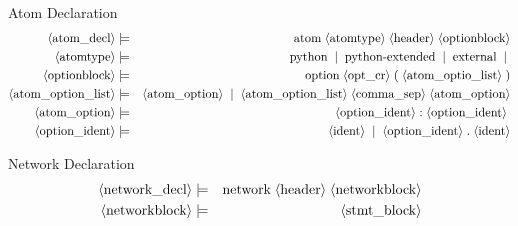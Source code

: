 Atom Declaration
\begin{eqnarray*}
  \pn{atom{\textunderscore}decl} &\pp&
    \sm{atom} \ww
    \pn{atomtype} \ww
    \pn{header} \ww
    \pn{optionblock} \\
  \pn{atomtype} &\pp&
    \sm{python} \oo
    \sm{python-extended} \oo
    \sm{external} \oo \\
  \pn{optionblock} &\pp&
    \sm{option} \ww
    \pn{opt{\textunderscore}cr} \ww
    \sm{(} \ww
    \pn{atom{\textunderscore}optio{\textunderscore}list} \ww
    \sm{)} \\
  \pn{atom{\textunderscore}option{\textunderscore}list} &\pp&
    \pn{atom{\textunderscore}option} \oo
    \pn{atom{\textunderscore}option{\textunderscore}list} \ww
    \pn{comma{\textunderscore}sep} \ww
    \pn{atom{\textunderscore}option} \\
  \pn{atom{\textunderscore}option} &\pp&
    \pn{option{\textunderscore}ident} \ww
    \sm{:} \ww
    \pn{option{\textunderscore}ident} \ww\\
  \pn{option{\textunderscore}ident} &\pp&
    \pn{ident} \oo
    \pn{option{\textunderscore}ident} \ww
    \sm{.} \ww
    \pn{ident} \\
\end{eqnarray*}

Network Declaration
\begin{eqnarray*}
  \pn{network{\textunderscore}decl} &\pp&
    \sm{network} \ww
    \pn{header} \ww
    \pn{networkblock} \\
  \pn{networkblock} &\pp&
    \pn{stmt{\textunderscore}block} \\
\end{eqnarray*}

